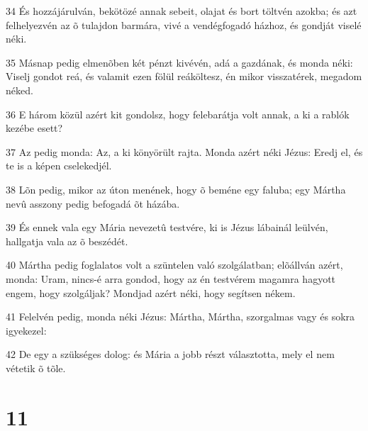 \par 34 És hozzájárulván, bekötözé annak sebeit, olajat és bort töltvén azokba; és azt felhelyezvén az õ tulajdon barmára, vivé a vendégfogadó házhoz, és gondját viselé néki.
\par 35 Másnap pedig elmenõben két pénzt kivévén, adá a gazdának, és monda néki: Viselj gondot reá, és valamit ezen fölül reáköltesz, én mikor visszatérek, megadom néked.
\par 36 E három közül azért kit gondolsz, hogy felebarátja volt annak, a ki a rablók kezébe esett?
\par 37 Az pedig monda: Az, a ki könyörült rajta. Monda azért néki Jézus: Eredj el, és te is a képen cselekedjél.
\par 38 Lõn pedig, mikor az úton menének, hogy õ beméne egy faluba; egy Mártha nevû asszony pedig befogadá õt házába.
\par 39 És ennek vala egy Mária nevezetû testvére, ki is Jézus lábainál leülvén, hallgatja vala az õ beszédét.
\par 40 Mártha pedig foglalatos volt a szüntelen való szolgálatban; elõállván azért, monda: Uram, nincs-é arra gondod, hogy az én testvérem magamra hagyott engem, hogy szolgáljak? Mondjad azért néki, hogy segítsen nékem.
\par 41 Felelvén pedig, monda néki Jézus: Mártha, Mártha, szorgalmas vagy és sokra igyekezel:
\par 42 De egy a szükséges dolog: és Mária a jobb részt választotta, mely el nem vétetik õ tõle.

\chapter{11}

